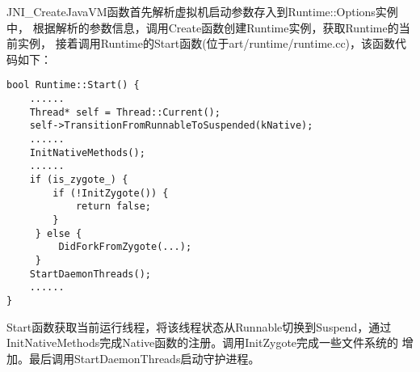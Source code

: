 JNI\_CreateJavaVM函数首先解析虚拟机启动参数存入到Runtime::Options实例中，
根据解析的参数信息，调用Create函数创建Runtime实例，获取Runtime的当前实例，
接着调用Runtime的Start函数(位于art/runtime/runtime.cc)，该函数代码如下：
\begin{lstlisting}
bool Runtime::Start() {
	......
	Thread* self = Thread::Current();
    self->TransitionFromRunnableToSuspended(kNative);
    ......
	InitNativeMethods();
	......
	if (is_zygote_) {
		if (!InitZygote()) {
		   	return false;
		}
	 } else {
		 DidForkFromZygote(...);
     }
	StartDaemonThreads();
    ......
}
\end{lstlisting}
Start函数获取当前运行线程，将该线程状态从Runnable切换到Suspend，通过
InitNativeMethods完成Native函数的注册。调用InitZygote完成一些文件系统的
增加。最后调用StartDaemonThreads启动守护进程。





